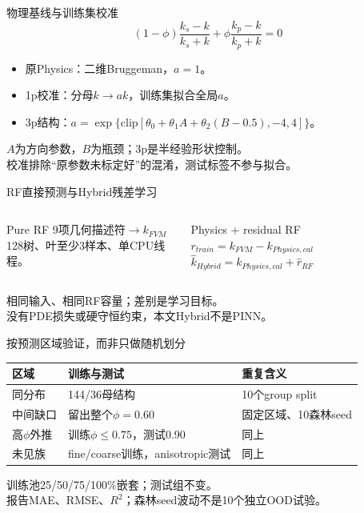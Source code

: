 \documentclass[10pt,aspectratio=169]{beamer}
\begin{document}
\begin{frame}{物理基线与训练集校准}
\[(1-\phi)\frac{k_s-k}{k_s+k}+\phi\frac{k_p-k}{k_p+k}=0\]
\begin{itemize}
\item 原Physics：二维Bruggeman，$a=1$\cite{bruggeman1935}。
\item 1p校准：分母$k\rightarrow ak$，训练集拟合全局$a$。
\item 3p结构：$a=\exp\{\mathrm{clip}[\theta_0+\theta_1 A+\theta_2(B-0.5),-4,4]\}$。
\end{itemize}
$A$为方向参数，$B$为瓶颈；3p是半经验形状控制\cite{lu2022}。\\
校准排除“原参数未标定好”的混淆，测试标签不参与拟合。
\end{frame}
\begin{frame}{RF直接预测与Hybrid残差学习}
\begin{columns}[T]
\begin{block}{Pure RF}
9项几何描述符$\rightarrow k_{FVM}$\\[2mm]
128树、叶至少3样本、单CPU线程\cite{breiman2001}。
\end{block}
\begin{block}{Physics + residual RF}
$r_{train}=k_{FVM}-k_{Physics,cal}$\\[2mm]
$\hat k_{Hybrid}=k_{Physics,cal}+\hat r_{RF}$
\end{block}
\end{columns}
\vspace{3mm}
相同输入、相同RF容量；差别是学习目标。\\
没有PDE损失或硬守恒约束，本文Hybrid不是PINN。
\end{frame}
\begin{frame}{按预测区域验证，而非只做随机划分}
\begin{tabular}{lll}\toprule
区域&训练与测试&重复含义\\\midrule
同分布&144/36母结构&10个group split\\
中间缺口&留出整个$\phi=0.60$&固定区域、10森林seed\\
高$\phi$外推&训练$\phi\leq0.75$，测试0.90&同上\\
未见族&fine/coarse训练，anisotropic测试&同上\\\bottomrule
\end{tabular}
\par\vspace{3mm}
训练池25/50/75/100\%嵌套；测试组不变。\\
报告MAE、RMSE、$R^2$；森林seed波动不是10个独立OOD试验。
\end{frame}
\end{document}
